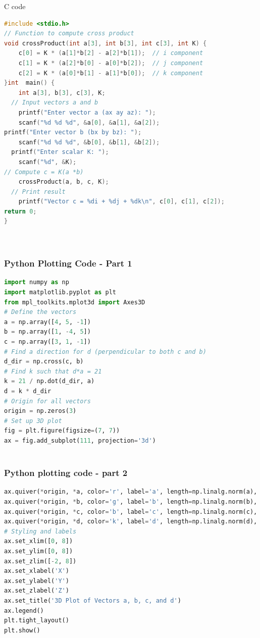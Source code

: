 \documentclass{beamer}
\begin{document}
\begin{frame}[fragile]{C code}
\begin{lstlisting}[language=C]
#include <stdio.h>
// Function to compute cross product
void crossProduct(int a[3], int b[3], int c[3], int K) {
    c[0] = K * (a[1]*b[2] - a[2]*b[1]);  // i component
    c[1] = K * (a[2]*b[0] - a[0]*b[2]);  // j component
    c[2] = K * (a[0]*b[1] - a[1]*b[0]);  // k component
}int  main() {
    int a[3], b[3], c[3], K;
  // Input vectors a and b
    printf("Enter vector a (ax ay az): ");
    scanf("%d %d %d", &a[0], &a[1], &a[2]);
printf("Enter vector b (bx by bz): ");
    scanf("%d %d %d", &b[0], &b[1], &b[2]);
  printf("Enter scalar K: ");
    scanf("%d", &K);
// Compute c = K(a *b)
    crossProduct(a, b, c, K);
  // Print result
    printf("Vector c = %di + %dj + %dk\n", c[0], c[1], c[2]);
return 0;
}




\end{lstlisting}
\end{frame}
\begin{frame}[fragile]

\frametitle{\textbf{Python Plotting Code - Part 1}}
\begin{lstlisting}[language=Python]
import numpy as np
import matplotlib.pyplot as plt
from mpl_toolkits.mplot3d import Axes3D
# Define the vectors
a = np.array([4, 5, -1])
b = np.array([1, -4, 5])
c = np.array([3, 1, -1])
# Find a direction for d (perpendicular to both c and b)
d_dir = np.cross(c, b)
# Find k such that d*a = 21
k = 21 / np.dot(d_dir, a)
d = k * d_dir
# Origin for all vectors
origin = np.zeros(3)
# Set up 3D plot
fig = plt.figure(figsize=(7, 7))
ax = fig.add_subplot(111, projection='3d')



\end{lstlisting}
\end{frame}
\begin{frame}[fragile]
\frametitle{\textbf{Python plotting code - part 2}}
\begin{lstlisting}[language = Python]
ax.quiver(*origin, *a, color='r', label='a', length=np.linalg.norm(a), arrow_length_ratio=0.1)
ax.quiver(*origin, *b, color='g', label='b', length=np.linalg.norm(b), arrow_length_ratio=0.1)
ax.quiver(*origin, *c, color='b', label='c', length=np.linalg.norm(c), arrow_length_ratio=0.1)
ax.quiver(*origin, *d, color='k', label='d', length=np.linalg.norm(d), arrow_length_ratio=0.15)
# Styling and labels
ax.set_xlim([0, 8])
ax.set_ylim([0, 8])
ax.set_zlim([-2, 8])
ax.set_xlabel('X')
ax.set_ylabel('Y')
ax.set_zlabel('Z')
ax.set_title('3D Plot of Vectors a, b, c, and d')
ax.legend()
plt.tight_layout()
plt.show() 
\end{lstlisting}
\end{frame}
\end{document}
